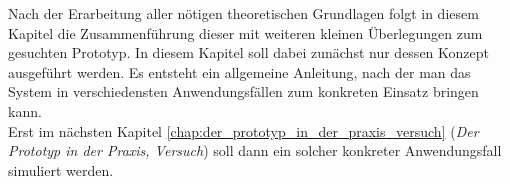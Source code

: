 Nach der Erarbeitung aller nötigen theoretischen Grundlagen folgt in diesem Kapitel die Zusammenführung dieser mit weiteren kleinen Überlegungen zum gesuchten Prototyp. In diesem Kapitel soll dabei zunächst nur dessen Konzept ausgeführt werden. Es entsteht ein allgemeine Anleitung, nach der man das System in verschiedensten Anwendungsfällen zum konkreten Einsatz bringen kann.\\
Erst im nächsten Kapitel \ref{chap:der_prototyp_in_der_praxis_versuch} (\emph{Der Prototyp in der Praxis, Versuch}) soll dann ein solcher konkreter Anwendungsfall simuliert werden.
\kleinerabstand
